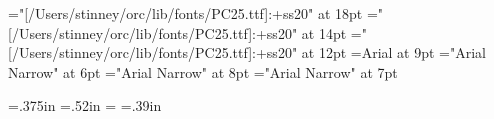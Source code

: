 
\let\everymathextra\relax
\let\preamble\relax


\let\seq\relax
\let\lname\relax
\let\sname\relax
\let\uname\relax
\let\chars\relax
\let\names\relax
\let\glyph\relax
\let\rglyf\relax
\let\image\relax
\let\notes\relax
\let\stags\relax

\let\sqdbcun\relax
\let\sqdbpua\relax
\let\sqseq\relax
\let\sqinv\relax
\let\sqchr\relax

\let\imagefloat\relax
\let\imagecaption\relax

\let\remfor\relax
\let\Hhhhh\relax

\let\ofspc\pcxxv

\def\unames{\eight\rm}

\def\ofs#1#2#3{}
\let\ofspc\pcxxv

\font\pcssXX="[/Users/stinney/orc/lib/fonts/PC25.ttf]:+ss20" at 18pt
\font\pcssxx="[/Users/stinney/orc/lib/fonts/PC25.ttf]:+ss20" at 14pt
\font\pcssxxx="[/Users/stinney/orc/lib/fonts/PC25.ttf]:+ss20" at 12pt
\font\helv=Arial at 9pt
\font\helvx="Arial Narrow" at 6pt
\font\helvy="Arial Narrow" at 8pt
\font\helvz="Arial Narrow" at 7pt

\def\ccchr{\pcssxx}
\def\ccuni{\helvx}

\def\beginchartlist{\newpage\begin{2column}\offinterlineskip} %
\def\endchartlist{\end{2column}}

\def\cclrow#1#2#3{%
        \vbox{\hsize3.2in\parindent0pt
              \hbox to 3.2in{%
              \hbox to .4in{\helvy#1\hfil}%
              \hbox to .4in{\pcssxx#2\hss}%
              \hbox to 2.4in{\hsize2.4in\vtop{\par\helvy\leavevmode\rightskip0pt plus1fil\relax#3\endgraf}}%
                            \hfil}}\vfil}
\def\cclnum#1{{\helv#1}}
\def\cclchr{\redpc}%
\def\ccluni{\Sans\eight\rm}

\let\twocol\relax

\let\glyf\relax
\let\fchr\relax
\let\fhex\relax
\let\dist\relax
\let\rhex\relax

\newdimen\ccwd \ccwd=.375in\relax
\newdimen\ccht \ccht=.52in\relax
\newdimen\cccwd \cccwd=\ccwd\relax
\newdimen\cccht \cccht=.39in\relax

\newdimen\cdliwd \cdliwd=2.75pc
\newdimen\slcwd \slcwd=3.65pc
\def\slcc{\pcssxxx}
\def\slcu{\helvy}

